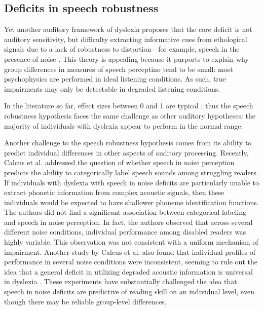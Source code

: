 \documentclass[../uwthesis.tex]{subfiles}
\begin{document}
\subsection{Deficits in speech robustness}
Yet another auditory framework of dyslexia proposes that the core deficit is not auditory sensitivity, but difficulty extracting informative cues from ethological signals due to a lack of robustness to distortion---for example, speech in the presence of noise \citep{Ziegler2009}. This theory is appealing because it purports to explain why group differences in measures of speech perceptino tend to be small: most psychophysics are performed in ideal listening conditions. As such, true impairments may only be detectable in degraded listening conditions.

In the literature so far, effect sizes between 0 and 1 are typical \citep{Messaoud-Galusi2011,Hazan2009,Boets2007,Dole2012,Poelmans2011,Calcus2016,Ziegler2009}; thus the speech robustness hypothesis faces the same challenge as other auditory hypotheses: the majority of individuals with dyslexia appear to perform in the normal range. 

Another challenge to the speech robustness hypothesis comes from its ability to predict individual differences in other aspects of auditory processing. Recently, Calcus et al. \citep{Calcus2016} addressed the question of whether speech in noise perception predicts the ability to categorically label speech sounds among struggling readers. If individuals with dyslexia with speech in noise deficits are particularly unable to extract phonetic information from complex acoustic signals, then these individuals would be expected to have shallower phoneme identification functions. The authors did not find a significant association between categorical labeling and speech in noise perception. In fact, the authors observed that across several different noise conditions, individual performance among disabled readers was highly variable. This observation was not consistent with a uniform mechanism of impairment. Another study by Calcus et al. also found that individual profiles of performance in several noise conditions were inconsistent, seeming to rule out the idea that a general deficit in utilizing degraded acoustic information is universal in dyslexia \citep{Calcus2018}. These experiments have substantially challenged the idea that speech in noise deficits are predictive of reading skill on an individual level, even though there may be reliable group-level differences.
\end{document}
